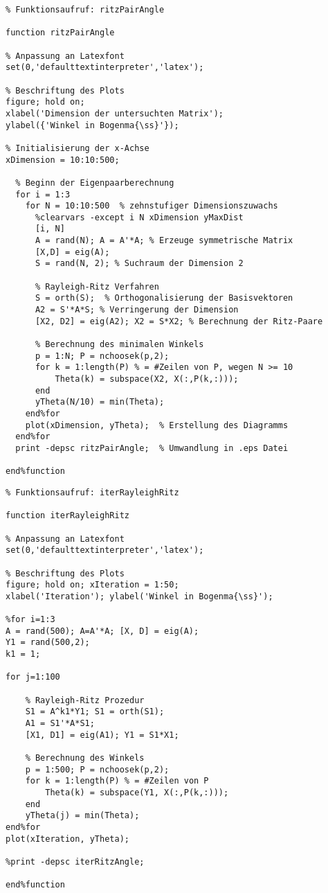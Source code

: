 \newpage
\begin{lstlisting}[caption=Berechnung des Winkels zwischen Ritz- und Eigenvektoren, captionpos=b, label=alg:appAlgorithm:ritzVecAngle]
% Eingabe: -; Ausgabe: -
% Funktionsaufruf: ritzPairAngle

function ritzPairAngle

% Anpassung an Latexfont
set(0,'defaulttextinterpreter','latex');

% Beschriftung des Plots
figure; hold on;
xlabel('Dimension der untersuchten Matrix');
ylabel({'Winkel in Bogenma{\ss}'});

% Initialisierung der x-Achse
xDimension = 10:10:500;

  % Beginn der Eigenpaarberechnung
  for i = 1:3
    for N = 10:10:500  % zehnstufiger Dimensionszuwachs
      %clearvars -except i N xDimension yMaxDist
      [i, N]
      A = rand(N); A = A'*A; % Erzeuge symmetrische Matrix
      [X,D] = eig(A);
      S = rand(N, 2); % Suchraum der Dimension 2

      % Rayleigh-Ritz Verfahren
      S = orth(S);  % Orthogonalisierung der Basisvektoren
      A2 = S'*A*S; % Verringerung der Dimension
      [X2, D2] = eig(A2); X2 = S*X2; % Berechnung der Ritz-Paare

      % Berechnung des minimalen Winkels
      p = 1:N; P = nchoosek(p,2);
      for k = 1:length(P) % = #Zeilen von P, wegen N >= 10
          Theta(k) = subspace(X2, X(:,P(k,:)));
      end
      yTheta(N/10) = min(Theta);
    end%for
    plot(xDimension, yTheta);  % Erstellung des Diagramms
  end%for
  print -depsc ritzPairAngle;  % Umwandlung in .eps Datei

end%function
\end{lstlisting}

\newpage

\begin{lstlisting}[caption=Berechnung des Winkels zwischen Ritz- und Eigenvektoren bei iterativem Rayleigh-Ritz Verfahren, captionpos=b, label=alg:appAlgorithm:iterRitzVecAngle]
% Eingabe: -; Ausgabe: -
% Funktionsaufruf: iterRayleighRitz

function iterRayleighRitz

% Anpassung an Latexfont
set(0,'defaulttextinterpreter','latex');

% Beschriftung des Plots
figure; hold on; xIteration = 1:50;
xlabel('Iteration'); ylabel('Winkel in Bogenma{\ss}');

%for i=1:3
A = rand(500); A=A'*A; [X, D] = eig(A);
Y1 = rand(500,2);
k1 = 1;

for j=1:100

    % Rayleigh-Ritz Prozedur
    S1 = A^k1*Y1; S1 = orth(S1);
    A1 = S1'*A*S1;
    [X1, D1] = eig(A1); Y1 = S1*X1;

    % Berechnung des Winkels
    p = 1:500; P = nchoosek(p,2);
    for k = 1:length(P) % = #Zeilen von P
        Theta(k) = subspace(Y1, X(:,P(k,:)));
    end
    yTheta(j) = min(Theta);
end%for
plot(xIteration, yTheta);

%print -depsc iterRitzAngle;

end%function
\end{lstlisting}

